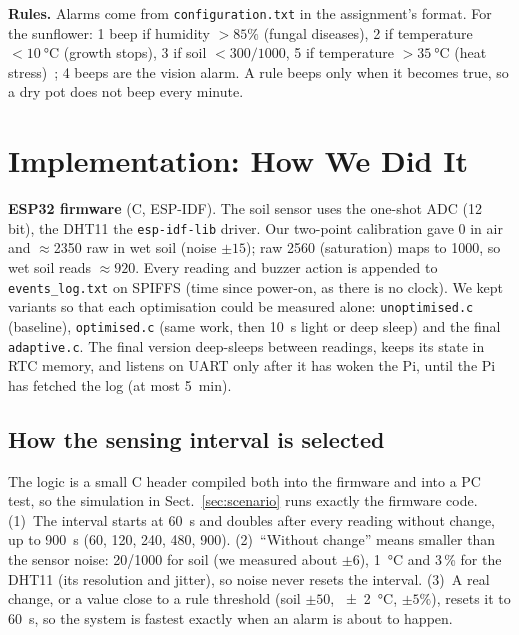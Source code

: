 \documentclass[runningheads]{llncs}
\begin{document}
\noindent\textbf{Rules.} Alarms come from \texttt{configuration.txt} in the assignment's format. For the sunflower: 1 beep if humidity $>85\%$ (fungal diseases), 2 if temperature $<\SI{10}{\celsius}$ (growth stops), 3 if soil $<300/1000$, 5 if temperature $>\SI{35}{\celsius}$ (heat stress)~\cite{schneiter,berglund}; 4 beeps are the vision alarm. A rule beeps only when it becomes true, so a dry pot does not beep every minute.

\section{Implementation: How We Did It}

\noindent\textbf{ESP32 firmware} (C, ESP-IDF). The soil sensor uses the one-shot ADC (12 bit), the DHT11 the \texttt{esp-idf-lib} driver. Our two-point calibration gave 0 in air and $\approx$2350 raw in wet soil (noise $\pm 15$); raw 2560 (saturation) maps to 1000, so wet soil reads $\approx 920$. Every reading and buzzer action is appended to \texttt{events\_log.txt} on SPIFFS (time since power-on, as there is no clock). We kept variants so that each optimisation could be measured alone: \texttt{unoptimised.c} (baseline), \texttt{optimised.c} (same work, then \SI{10}{s} light or deep sleep) and the final \texttt{adaptive.c}. The final version deep-sleeps between readings, keeps its state in RTC memory, and listens on UART only after it has woken the Pi, until the Pi has fetched the log (at most \SI{5}{min}).

\subsection{How the sensing interval is selected}\label{sec:interval}
The logic is a small C header compiled both into the firmware and into a PC test, so the simulation in Sect.~\ref{sec:scenario} runs exactly the firmware code.
(1)~The interval starts at \SI{60}{s} and doubles after every reading without change, up to \SI{900}{s} (60, 120, 240, 480, 900).
(2)~``Without change'' means smaller than the sensor noise: 20/1000 for soil (we measured about $\pm 6$), \SI{1}{\celsius} and 3\,\% for the DHT11 (its resolution and jitter), so noise never resets the interval.
(3)~A real change, or a value close to a rule threshold (soil $\pm 50$, \SI{\pm 2}{\celsius}, $\pm 5\%$), resets it to \SI{60}{s}, so the system is fastest exactly when an alarm is about to happen.
\end{document}

